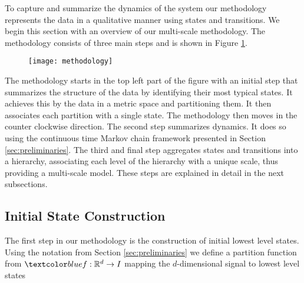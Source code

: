 \iffalse
\begin{itemize}
	\item Initial state construction (State Identification)
	\item Aggregation (State Aggregation)
	\item Transition probabililties (Modeling transitions)
\end{itemize}
\fi

To capture and summarize the dynamics of the system our methodology represents the data
in a qualitative manner using states and transitions. We begin this section with an overview
of our multi-scale methodology. The methodology consists of three main steps and is
shown in Figure \ref{fig:methodology}.

\begin{figure}[h!]
	\centering
	\texttt{[image: methodology]}
	\caption{}
	\label{fig:methodology}
\end{figure}
The methodology starts in the top left part of the figure with an initial step that summarizes
the structure of the data by identifying their most typical states. It achieves this by 
the data in a  metric space and partitioning them. It then associates
each partition with a single state.
The methodology then moves in the counter clockwise direction. The second step summarizes
dynamics. It does so using the continuous time Markov chain framework presented in Section \ref{sec:preliminaries}.
The third and final step aggregates states and transitions into a hierarchy, associating each
level of the hierarchy with a unique scale, thus providing a multi-scale model. These steps 
are explained in detail in the next subsections.


\subsection{Initial State Construction}
\label{sec:framework-states}

The first step in our methodology is the construction of initial lowest level states. Using the notation
from Section \ref{sec:preliminaries} we define a partition function 
from $\lstopar{f}: \mathbb{R}^d \rightarrow I$ mapping the $d$-dimensional signal to lowest level states

